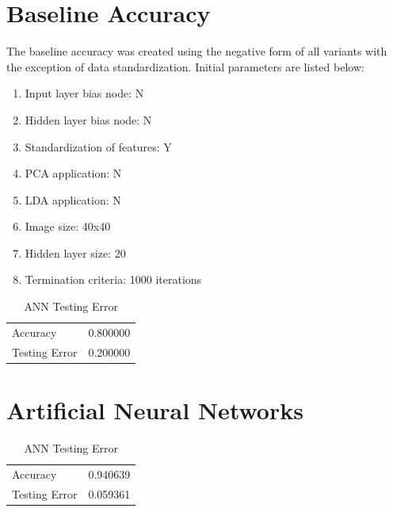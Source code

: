 \documentclass[12pt]{article}
\begin{document}
\section{Baseline Accuracy}
The baseline accuracy was created using the negative form of all variants with the exception of data standardization. Initial parameters are listed below:
\begin{enumerate}
  \item Input layer bias node: N
  \item Hidden layer bias node: N
  \item Standardization of features: Y
  \item PCA application: N
  \item LDA application: N
  \item Image size: 40x40
  \item Hidden layer size: 20
  \item Termination criteria: 1000 iterations
\end{enumerate}
\begin{table}[h]
  \begin{center}
    \begin{tabular}{|l|l|}
      \hline
      Accuracy & 0.800000\\
      Testing Error & 0.200000\\
      \hline
    \end{tabular}
    \caption{ANN Testing Error}
  \end{center}
\end{table}

\section{Artificial Neural Networks}
\begin{table}[h]
\begin{center}
\begin{tabular}{|l|l|}
\hline
Accuracy & 0.940639\\
Testing Error & 0.059361\\
\hline
\end{tabular}
\caption{ANN Testing Error}
\end{center}
\end{table}
\end{document}
